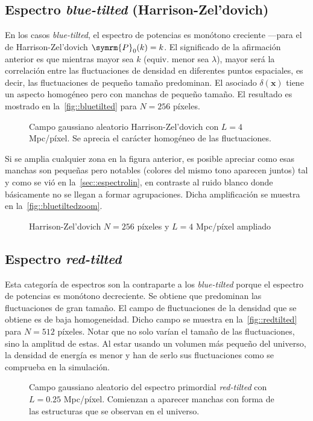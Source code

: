 \subsection{Espectro \textit{blue-tilted} (Harrison-Zel'dovich)}
En los casos \textit{blue-tilted}, el espectro de potencias es monótono creciente ---para el de Harrison-Zel'dovich \(\symrm{P}_0(k)=k\). El significado de la afirmación anterior es que mientras mayor sea \(k\) (equiv. menor sea \(\lambda\)), mayor será la correlación entre las fluctuaciones de densidad en diferentes puntos espaciales, es decir, las fluctuaciones de pequeño tamaño predominan. El asociado \(\delta(\symbf{x})\) tiene un aspecto homogéneo pero con manchas de pequeño tamaño. El resultado es mostrado en la~\autoref{fig::bluetilted} para \(N=256\) píxeles.
\begin{figure}[h]
    \centering
    \scalebox{.835}{}
    \caption[Harrison-Zel'dovich \(N=256\) píxeles y \(L=4\) Mpc/píxel]{Campo gaussiano aleatorio Harrison-Zel'dovich con \(L=4\) Mpc/píxel. Se aprecia el carácter homogéneo de las fluctuaciones.}
    \label{fig::bluetilted}
\end{figure}

Si se amplia cualquier zona en la figura anterior, es posible apreciar como esas manchas son pequeñas pero notables (colores del mismo tono aparecen juntos) tal y como se vió en la~\autoref{sec::espectrolin}, en contraste al ruido blanco donde básicamente no se llegan a formar agrupaciones. Dicha amplificación se muestra en la~\autoref{fig::bluetiltedzoom}.
\begin{figure}[ht]
    \centering
    \scalebox{.85}{}
    \caption{Harrison-Zel'dovich \(N=256\) píxeles y \(L=4\) Mpc/píxel ampliado}
    \label{fig::bluetiltedzoom}
\end{figure}
\subsection{Espectro \textit{red-tilted}}
Esta categoría de espectros son la contraparte a los \textit{blue-tilted} porque el espectro de potencias es monótono decreciente. Se obtiene que predominan las fluctuaciones de gran tamaño. El campo de fluctuaciones de la densidad que se obtiene es de baja homogeneidad. Dicho campo se muestra en la~\autoref{fig::redtilted} para \(N=512\) píxeles. Notar que no solo varían el tamaño de las fluctuaciones, sino la amplitud de estas. Al estar usando un volumen más pequeño del universo, la densidad de energía es menor y han de serlo sus fluctuaciones como se comprueba en la simulación.
\begin{figure}[ht]
    \centering
    \scalebox{.85}{}
    \caption[Espectro primordial \textit{red-tilted} \(N=512\) píxeles y \(L=0.25\) Mpc/píxel]{Campo gaussiano aleatorio del espectro primordial \textit{red-tilted} con \(L=0.25\) Mpc/píxel. Comienzan a aparecer manchas con forma de las estructuras que se observan en el universo.}
    \label{fig::redtilted}
\end{figure}
